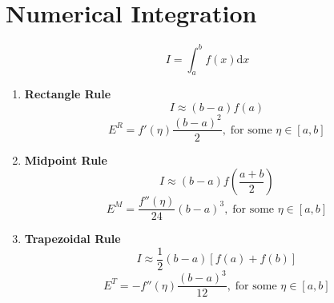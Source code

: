 \documentclass{article}
\begin{document}
\section{Numerical Integration}
\[I = \int_{a}^{b} f(x) \text{d}x\]
\begin{enumerate} 
	\itemsep1em
	\item \textbf{Rectangle Rule}
		\[I \approx (b - a)f(a)\]
		\[E^R = f'(\eta)\frac{(b-a)^2}{2},\;\text{for some }\eta\in[a, b]\]
	
	\item \textbf{Midpoint Rule}
		\[I \approx (b - a)f\left(\frac{a + b}{2}\right) \]
		\[E^M = \frac{f''(\eta)}{24}(b - a)^3,\;\text{for some }\eta\in[a, b]\]
	
	\item \textbf{Trapezoidal Rule}
	\[I \approx \frac{1}{2}(b - a)[f(a) + f(b)]\]
	\[E^T = -f''(\eta)\frac{(b - a)^3}{12},\;\text{for some }\eta\in[a, b]\]


\end{enumerate}
\end{document}
